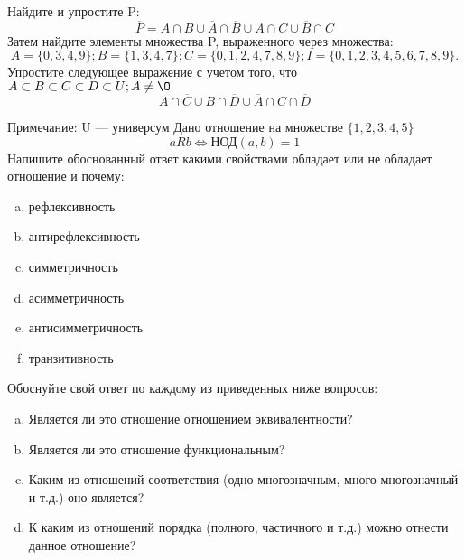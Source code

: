 \documentclass[10pt]{exam}
\begin{document}
\begin{questions}
\question
Найдите и упростите P:
\begin{equation*}
\overline{P} = A \cap B \cup \overline{A} \cap \overline{B} \cup A \cap C \cup \overline{B} \cap C
\end{equation*}
Затем найдите элементы множества P, выраженного через множества:
\begin{equation*}
A = \{0, 3, 4, 9\}; 
B = \{1, 3, 4, 7\};
C = \{0, 1, 2, 4, 7, 8, 9\};
I = \{0, 1, 2, 3, 4, 5, 6, 7, 8, 9\}.
\end{equation*}\question
Упростите следующее выражение с учетом того, что $A\subset B \subset C \subset D \subset U; A \neq \O$
\begin{equation*}
A \cap  \overline{C} \cup B \cap \overline{D} \cup  \overline{A} \cap C \cap  \overline{D}
\end{equation*}

Примечание: U — универсум\question
Дано отношение на множестве $\{1, 2, 3, 4, 5\}$ 
\begin{equation*}
aRb \iff  \text{НОД}(a,b) =1
\end{equation*}
Напишите обоснованный ответ какими свойствами обладает или не обладает отношение и почему:   
\begin{enumerate} [a)]\setcounter{enumi}{0}
\item рефлексивность
\item антирефлексивность
\item симметричность
\item асимметричность
\item антисимметричность
\item транзитивность
\end{enumerate}

Обоснуйте свой ответ по каждому из приведенных ниже вопросов:
\begin{enumerate} [a)]\setcounter{enumi}{0}
    \item Является ли это отношение отношением эквивалентности?
    \item Является ли это отношение функциональным?
    \item Каким из отношений соответствия (одно-многозначным, много-многозначный и т.д.) оно является?
    \item К каким из отношений порядка (полного, частичного и т.д.) можно отнести данное отношение?
\end{enumerate}



\end{questions}
\end{document}
